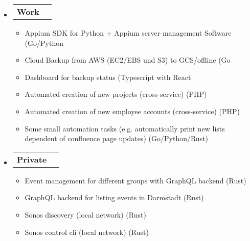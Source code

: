 \documentclass[letterpaper,12pt]{article}[leftmargin=*]
\makeatletter
\def \entryspacing {-0pt}
\newcommand{\resumeEntryStart}{\begin{itemize}[leftmargin=2.5mm]}
\newcommand{\resumeEntryEnd}{\end{itemize}\vspace{\entryspacing}}
\newcommand{\resumeItemListStart}{\begin{itemize}[leftmargin=4.5mm]}
\newcommand{\resumeItemListEnd}{\end{itemize}}
\newcommand{\resumeItem}[1]{
  \item\small{
    {#1 \vspace{-2pt}}
  }
}
\newcommand{\resumeEntryTD}[2]{
  \vspace{-1pt}\item[]
    \begin{tabular*}{0.97\textwidth}{l@{\extracolsep{\fill}}r}
      \textbf{\color{primary}#1} & {\firabook\color{accent}\small#2} \\
    \end{tabular*}\vspace{-6pt}
}
\makeatother
\begin{document}
  \resumeEntryStart
    \resumeEntryTD
        {Work}{}
    \resumeItemListStart
      \resumeItem {Appium SDK for Python + Appium server-management Software (Go/Python}{}
      \resumeItem {Cloud Backup from AWS (EC2/EBS und S3) to GCS/offline (Go}{}
      \resumeItem {Dashboard for backup status (Typescript with React}{}
      \resumeItem {Automated creation of new projects (cross-service) (PHP)}{}
      \resumeItem {Automated creation of new employee accounts (cross-service) (PHP)}{}
      \resumeItem {Some small automation tasks (e.g. automatically print new lists dependent of confluence page updates) (Go/Python/Rust)}
    \resumeItemListEnd
    \resumeEntryTD
        {Private}{}
    \resumeItemListStart
        \resumeItem {Event management for different groups with GraphQL backend (Rust)}{}
        \resumeItem {GraphQL backend for listing events in Darmstadt (Rust)}{}
        \resumeItem {Sonos discovery (local network) (Rust)}{}
        \resumeItem {Sonos control cli (local network) (Rust)}{}
    \resumeItemListEnd
  \resumeEntryEnd
\end{document}
